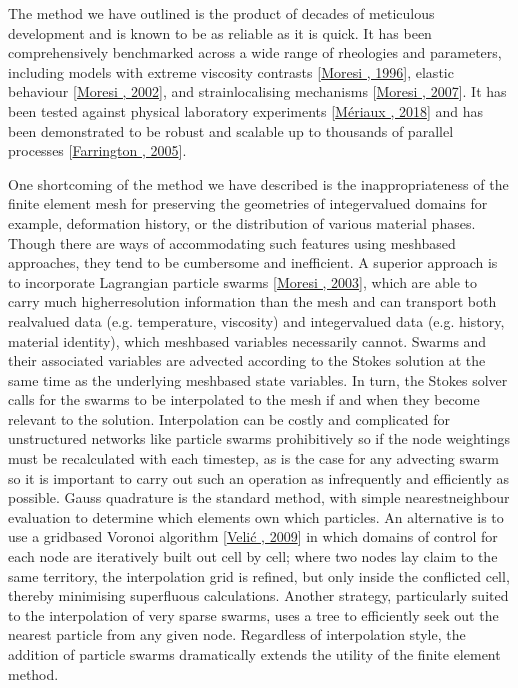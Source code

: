 \documentclass[letterpaper,10pt,english]{jupyterBook}
\begin{document}
\sphinxAtStartPar
The method we have outlined is the product of decades of meticulous development and is known to be as reliable as it is quick. It has been comprehensively benchmarked across a wide range of rheologies and parameters, including models with extreme viscosity contrasts {[}\hyperlink{cite.references:id153}{Moresi , 1996}{]}, elastic behaviour {[}\hyperlink{cite.references:id381}{Moresi , 2002}{]}, and strain\sphinxhyphen{}localising mechanisms {[}\hyperlink{cite.references:id382}{Moresi , 2007}{]}. It has been tested against physical laboratory experiments {[}\hyperlink{cite.references:id680}{Mériaux , 2018}{]} and has been demonstrated to be robust and scalable up to thousands of parallel processes {[}\hyperlink{cite.references:id669}{Farrington , 2005}{]}.

\sphinxAtStartPar
One shortcoming of the method we have described is the inappropriateness of the finite element mesh for preserving the geometries of integer\sphinxhyphen{}valued domains \sphinxhyphen{} for example, deformation history, or the distribution of various material phases. Though there are ways of accommodating such features using mesh\sphinxhyphen{}based approaches, they tend to be cumbersome and inefficient. A superior approach is to incorporate Lagrangian particle swarms {[}\hyperlink{cite.references:id145}{Moresi , 2003}{]}, which are able to carry much higher\sphinxhyphen{}resolution information than the mesh and can transport both real\sphinxhyphen{}valued data (e.g. temperature, viscosity) and integer\sphinxhyphen{}valued data (e.g. history, material identity), which mesh\sphinxhyphen{}based variables necessarily cannot. Swarms and their associated variables are advected according to the Stokes solution at the same time as the underlying mesh\sphinxhyphen{}based state variables. In turn, the Stokes solver calls for the swarms to be interpolated to the mesh if and when they become relevant to the solution. Interpolation can be costly and complicated for unstructured networks like particle swarms \sphinxhyphen{} prohibitively so if the node weightings must be recalculated with each timestep, as is the case for any advecting swarm \sphinxhyphen{} so it is important to carry out such an operation as infrequently and efficiently as possible. Gauss quadrature is the standard method, with simple nearest\sphinxhyphen{}neighbour evaluation to determine which elements own which particles. An alternative is to use a grid\sphinxhyphen{}based Voronoi algorithm {[}\hyperlink{cite.references:id682}{Velić , 2009}{]} in which domains of control for each node are iteratively built out cell by cell; where two nodes lay claim to the same territory, the interpolation grid is refined, but only inside the conflicted cell, thereby minimising superfluous calculations. Another strategy, particularly suited to the interpolation of very sparse swarms, uses a  tree to efficiently seek out the nearest particle from any given node. Regardless of interpolation style, the addition of particle swarms dramatically extends the utility of the finite element method.
\end{document}
